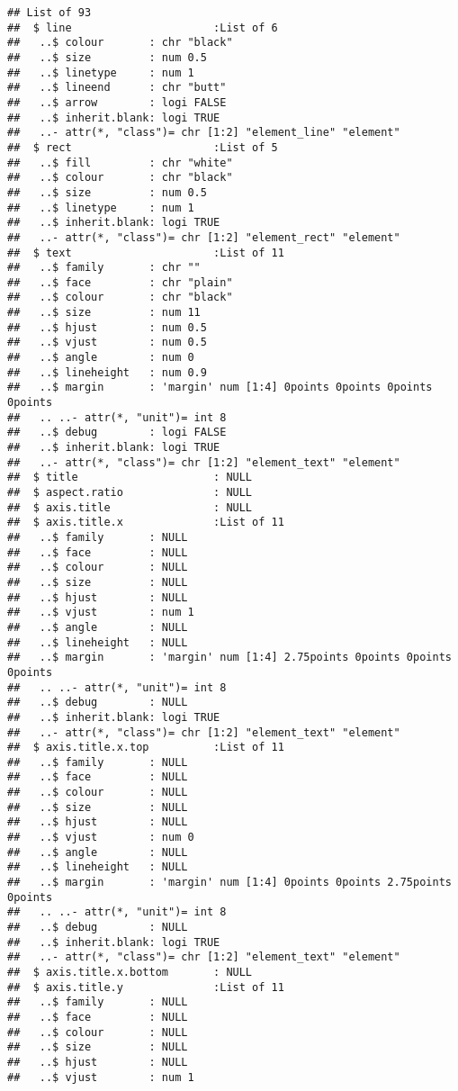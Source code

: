\documentclass[
]{article}
\begin{document}
\begin{verbatim}
## List of 93
##  $ line                      :List of 6
##   ..$ colour       : chr "black"
##   ..$ size         : num 0.5
##   ..$ linetype     : num 1
##   ..$ lineend      : chr "butt"
##   ..$ arrow        : logi FALSE
##   ..$ inherit.blank: logi TRUE
##   ..- attr(*, "class")= chr [1:2] "element_line" "element"
##  $ rect                      :List of 5
##   ..$ fill         : chr "white"
##   ..$ colour       : chr "black"
##   ..$ size         : num 0.5
##   ..$ linetype     : num 1
##   ..$ inherit.blank: logi TRUE
##   ..- attr(*, "class")= chr [1:2] "element_rect" "element"
##  $ text                      :List of 11
##   ..$ family       : chr ""
##   ..$ face         : chr "plain"
##   ..$ colour       : chr "black"
##   ..$ size         : num 11
##   ..$ hjust        : num 0.5
##   ..$ vjust        : num 0.5
##   ..$ angle        : num 0
##   ..$ lineheight   : num 0.9
##   ..$ margin       : 'margin' num [1:4] 0points 0points 0points 0points
##   .. ..- attr(*, "unit")= int 8
##   ..$ debug        : logi FALSE
##   ..$ inherit.blank: logi TRUE
##   ..- attr(*, "class")= chr [1:2] "element_text" "element"
##  $ title                     : NULL
##  $ aspect.ratio              : NULL
##  $ axis.title                : NULL
##  $ axis.title.x              :List of 11
##   ..$ family       : NULL
##   ..$ face         : NULL
##   ..$ colour       : NULL
##   ..$ size         : NULL
##   ..$ hjust        : NULL
##   ..$ vjust        : num 1
##   ..$ angle        : NULL
##   ..$ lineheight   : NULL
##   ..$ margin       : 'margin' num [1:4] 2.75points 0points 0points 0points
##   .. ..- attr(*, "unit")= int 8
##   ..$ debug        : NULL
##   ..$ inherit.blank: logi TRUE
##   ..- attr(*, "class")= chr [1:2] "element_text" "element"
##  $ axis.title.x.top          :List of 11
##   ..$ family       : NULL
##   ..$ face         : NULL
##   ..$ colour       : NULL
##   ..$ size         : NULL
##   ..$ hjust        : NULL
##   ..$ vjust        : num 0
##   ..$ angle        : NULL
##   ..$ lineheight   : NULL
##   ..$ margin       : 'margin' num [1:4] 0points 0points 2.75points 0points
##   .. ..- attr(*, "unit")= int 8
##   ..$ debug        : NULL
##   ..$ inherit.blank: logi TRUE
##   ..- attr(*, "class")= chr [1:2] "element_text" "element"
##  $ axis.title.x.bottom       : NULL
##  $ axis.title.y              :List of 11
##   ..$ family       : NULL
##   ..$ face         : NULL
##   ..$ colour       : NULL
##   ..$ size         : NULL
##   ..$ hjust        : NULL
##   ..$ vjust        : num 1

\end{verbatim}
\end{document}
